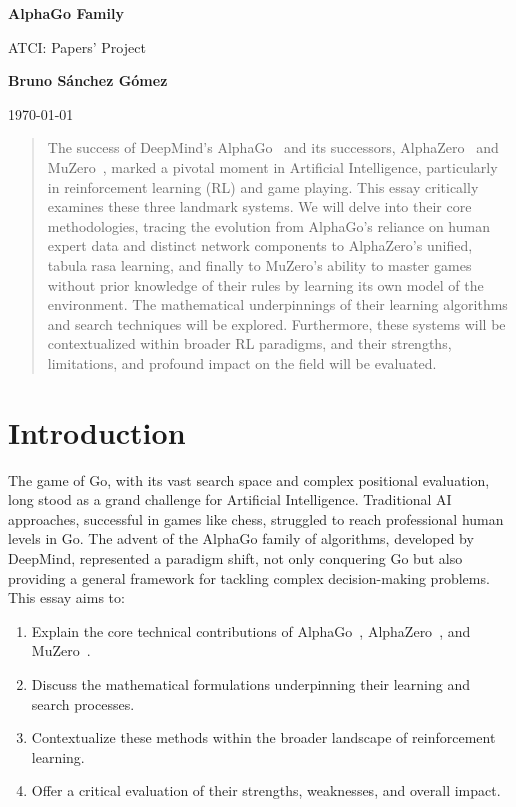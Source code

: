\documentclass[11pt,a4paper]{article}
\author{Bruno Sánchez Gómez}
\date{\today}
\begin{document}
\begin{titlepage}
    \centering
    \vspace*{2cm}
    {\Huge \bfseries AlphaGo Family \par}
    \vspace{2cm}
    {\huge ATCI: Papers' Project \par}
    \vspace{10cm}
    {\large \textbf{Bruno Sánchez Gómez} \par}
    \vfill
    {\large \today \par}
\end{titlepage}

\begin{abstract}
The success of DeepMind's AlphaGo~\cite{alphago} and its successors, AlphaZero~\cite{alphazero} and MuZero~\cite{muzero}, marked a pivotal moment in Artificial Intelligence, particularly in reinforcement learning (RL) and game playing. This essay critically examines these three landmark systems. We will delve into their core methodologies, tracing the evolution from AlphaGo's reliance on human expert data and distinct network components to AlphaZero's unified, tabula rasa learning, and finally to MuZero's ability to master games without prior knowledge of their rules by learning its own model of the environment. The mathematical underpinnings of their learning algorithms and search techniques will be explored. Furthermore, these systems will be contextualized within broader RL paradigms, and their strengths, limitations, and profound impact on the field will be evaluated.
\end{abstract}

\section{Introduction}
The game of Go, with its vast search space and complex positional evaluation, long stood as a grand challenge for Artificial Intelligence. Traditional AI approaches, successful in games like chess, struggled to reach professional human levels in Go. The advent of the AlphaGo family of algorithms, developed by DeepMind, represented a paradigm shift, not only conquering Go but also providing a general framework for tackling complex decision-making problems. This essay aims to:
\begin{enumerate}
    \item Explain the core technical contributions of AlphaGo~\cite{alphago}, AlphaZero~\cite{alphazero}, and MuZero~\cite{muzero}.
    \item Discuss the mathematical formulations underpinning their learning and search processes.
    \item Contextualize these methods within the broader landscape of reinforcement learning.
    \item Offer a critical evaluation of their strengths, weaknesses, and overall impact.
\end{enumerate}
\end{document}
